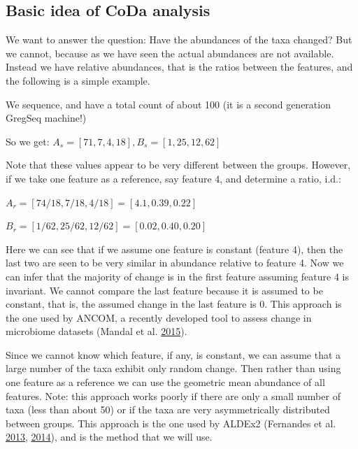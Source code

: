 \documentclass[onecolumn]{book}
\theoremstyle{definition}
\theoremstyle{definition}
\theoremstyle{definition}
\theoremstyle{remark}
\begin{document}
\hypertarget{basic-idea-of-coda-analysis}{%
\subsection{Basic idea of CoDa
analysis}\label{basic-idea-of-coda-analysis}}

We want to answer the question: Have the abundances of the taxa changed?
But we cannot, because as we have seen the actual abundances are not
available. Instead we have relative abundances, that is the ratios
between the features, and the following is a simple example.

We sequence, and have a total count of about 100 (it is a second
generation GregSeq machine!)

So we get: \begin{math}A_s = [71,7,4,18], B_s = [1,25,12,62]
\end{math}

Note that these values appear to be very different between the groups.
However, if we take one feature as a reference, say feature 4, and
determine a ratio, i.d.:

\begin{math}
A_r = [ 74/18, 7/18, 4/18 ] = [ 4.1, 0.39, 0.22 ]
\end{math}

\begin{math}
B_r = [ 1/62, 25/62, 12/62 ] = [ 0.02 , 0.40, 0.20 ]
\end{math}

Here we can see that if we assume one feature is constant (feature 4),
then the last two are seen to be very similar in abundance relative to
feature 4. Now we can infer that the majority of change is in the first
feature assuming feature 4 is invariant. We cannot compare the last
feature because it is assumed to be constant, that is, the assumed
change in the last feature is 0. This approach is the one used by ANCOM,
a recently developed tool to assess change in microbiome datasets
(Mandal et al. \protect\hyperlink{ref-ancom:2015}{2015}).

Since we cannot know which feature, if any, is constant, we can assume
that a large number of the taxa exhibit only random change. Then rather
than using one feature as a reference we can use the geometric mean
abundance of all features. Note: this approach works poorly if there are
only a small number of taxa (less than about 50) or if the taxa are very
asymmetrically distributed between groups. This approach is the one used
by ALDEx2 (Fernandes et al.
\protect\hyperlink{ref-fernandes:2013}{2013},
\protect\hyperlink{ref-fernandes:2014}{2014}), and is the method that we
will use.
\end{document}
